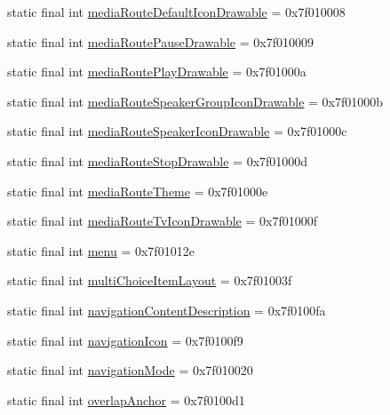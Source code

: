 \begin{CompactItemize}
\item 
static final int \hyperlink{classandroid_1_1support_1_1v4_1_1_r_1_1attr_2debbad1a2aac772f35f60dbc40dcc57}{mediaRouteDefaultIconDrawable} = 0x7f010008
\item 
static final int \hyperlink{classandroid_1_1support_1_1v4_1_1_r_1_1attr_ac7bfc56fec3f7e25bfde9b2c141a667}{mediaRoutePauseDrawable} = 0x7f010009
\item 
static final int \hyperlink{classandroid_1_1support_1_1v4_1_1_r_1_1attr_1d90bb363e884d680a1011a911d9fe4c}{mediaRoutePlayDrawable} = 0x7f01000a
\item 
static final int \hyperlink{classandroid_1_1support_1_1v4_1_1_r_1_1attr_3424f54730cefd524a2f29e884345413}{mediaRouteSpeakerGroupIconDrawable} = 0x7f01000b
\item 
static final int \hyperlink{classandroid_1_1support_1_1v4_1_1_r_1_1attr_c143998f37fa865799adeda6207cdaf9}{mediaRouteSpeakerIconDrawable} = 0x7f01000c
\item 
static final int \hyperlink{classandroid_1_1support_1_1v4_1_1_r_1_1attr_f07c12ce0ae4e05c30b814c3640d7841}{mediaRouteStopDrawable} = 0x7f01000d
\item 
static final int \hyperlink{classandroid_1_1support_1_1v4_1_1_r_1_1attr_feacb3f6132d8e12f9a50b46709bbc70}{mediaRouteTheme} = 0x7f01000e
\item 
static final int \hyperlink{classandroid_1_1support_1_1v4_1_1_r_1_1attr_264691dfe48db9ee911b2c61a5e7cd8c}{mediaRouteTvIconDrawable} = 0x7f01000f
\item 
static final int \hyperlink{classandroid_1_1support_1_1v4_1_1_r_1_1attr_6aa276b44c22d1b99d6ceb4cabb97af0}{menu} = 0x7f01012e
\item 
static final int \hyperlink{classandroid_1_1support_1_1v4_1_1_r_1_1attr_2ee7c78f28d66a8d2f8e8879c6231a3e}{multiChoiceItemLayout} = 0x7f01003f
\item 
static final int \hyperlink{classandroid_1_1support_1_1v4_1_1_r_1_1attr_f1a94b0e5c71eea7e5a81523b13d4955}{navigationContentDescription} = 0x7f0100fa
\item 
static final int \hyperlink{classandroid_1_1support_1_1v4_1_1_r_1_1attr_baa6c26fb7c93f2886eae8898fbb0ffd}{navigationIcon} = 0x7f0100f9
\item 
static final int \hyperlink{classandroid_1_1support_1_1v4_1_1_r_1_1attr_5324d7c14715ffde107a0fc8e01bc374}{navigationMode} = 0x7f010020
\item 
static final int \hyperlink{classandroid_1_1support_1_1v4_1_1_r_1_1attr_c028b1b51295edd03abfb4ddc76db9f2}{overlapAnchor} = 0x7f0100d1

\end{CompactItemize}
